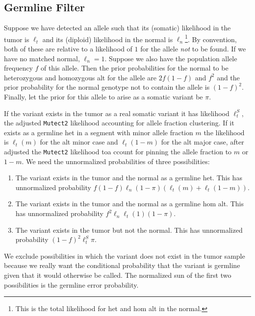 \documentclass[nofootinbib,amssymb,amsmath]{revtex4}
\newcommand{\code}[1]{\texttt{#1}}
\begin{document}
\subsection{Germline Filter}\label{germline-filter}
Suppose we have detected an allele such that its (somatic) likelihood in the tumor is $\ell_t$ and its (diploid) likelihood in the normal is $\ell_n$\footnote{This is the total likelihood for het and hom alt in the normal.}.  By convention, both of these are relative to a likelihood of $1$ for the allele \textit{not} to be found.  If we have no matched normal, $\ell_n = 1$.  Suppose we also have the population allele frequency $f$ of this allele.  Then the prior probabilities for the normal to be heterozygous and homozygous alt for the allele are $2f(1-f)$ and $f^2$ and the prior probability for the normal genotype not to contain the allele is $(1-f)^2$.  Finally, let the prior for this allele to arise as a somatic variant be $\pi$.

If the variant exists in the tumor as a real somatic variant it has likelihood $\ell^S_t$, the adjusted \code{Mutect2} likelihood accounting for allele fraction clustering.  If it exists as a germline het in a segment with minor allele fraction $m$ the likelihood is $\ell_t(m)$ for the alt minor case and $\ell_t(1-m)$ for the alt major case, after adjusted the \code{Mutect2} likelihood toa ccount for pinning the allele fraction to $m$ or $1-m$.  We need the unnormalized probabilities of three possibilities:
\begin{enumerate}
\item The variant exists in the tumor and the normal as a germline het.  This has unnormalized probability $f(1-f) \ell_n (1 - \pi) \left( \ell_t(m) + \ell_t(1 - m) \right)$.
\item The variant exists in the tumor and the normal as a germline hom alt.  This has unnormalized probability $f^2 \ell_n \ell_t(1) (1 - \pi)$.
\item The variant exists in the tumor but not the normal.  This has unnormalized probability $(1-f)^2 \ell^S_t \pi$.
\end{enumerate}

We exclude possibilities in which the variant does not exist in the tumor sample because we really want the conditional probability that the variant is germline given that it would otherwise be called.  The normalized sun of the first two possibilities is the germline error probability.
\end{document}
